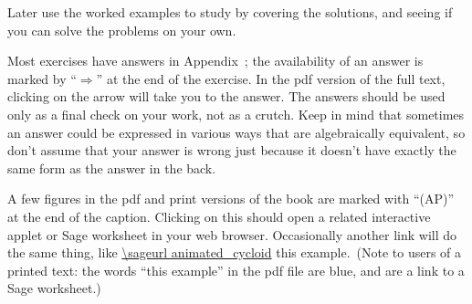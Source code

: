 \item {\question}
Later use the worked examples to study by covering the solutions,
and seeing if you can solve the problems on your own.

\item{\question} Most exercises have answers in
  Appendix~; the availability of an answer is
  marked by ``$\Rightarrow$'' at the end of the exercise. In the pdf
  version of the full text, clicking on the arrow will take you to the
  answer.  The answers should be used only as a final check on your
  work, not as a crutch.  Keep in mind that sometimes an answer could
  be expressed in various ways that are algebraically equivalent, so
  don't assume that your answer is wrong just because it doesn't have
  exactly the same form as the answer in the back.

\item{\question} A few figures in the pdf and print versions of the
  book are marked with ``(AP)'' at the end of the caption. Clicking on
  this should open a related interactive applet or Sage worksheet in
  your web browser. Occasionally another link will do the same thing,
  like \expandafter\url\expandafter{\sageurl animated_cycloid}%
  this example.\endurl\ (Note to users of a printed text: the words
  ``this example'' in the pdf file are blue, and are a link to a Sage
  worksheet.)  \endlist
